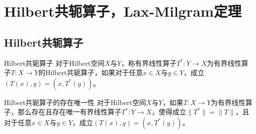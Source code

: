 \documentclass[lang = cn, scheme = chinese, thmcnt = section]{elegantbook}
\begin{document}
\section{Hilbert共轭算子，Lax-Milgram定理}

\subsection{Hilbert共轭算子}

\begin{definition}{Hilbert共轭算子}
	对于Hilbert空间$X$与$Y$，称有界线性算子$T^*:Y\to X$为有界线性算子$T:X\to Y$的Hilbert共轭算子，如果对于任意$x\in X$与$y\in Y$，成立$(T(x),y)=(x,T^*(y))$。
\end{definition}

\begin{theorem}{Hilbert共轭算子的存在唯一性}
	对于Hilbert空间$X$与$Y$，如果$T:X\to Y$为有界线性算子，那么存在且存在唯一有界线性算子$T^*:Y\to X$，使得成立$\|T^*\|=\|T\|$，且对于任意$x\in X$与$y\in Y$，成立$(T(x),y)=(x,T^*(y))$。
\end{theorem}
\end{document}
